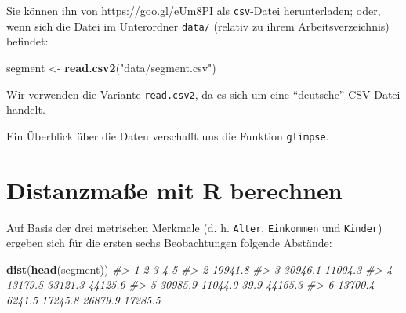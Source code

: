 \documentclass[12pt,ngerman,]{book}
\makeatletter
\newenvironment{Shaded}{\begin{snugshade}}{\end{snugshade}}
\newcommand{\KeywordTok}[1]{\textcolor[rgb]{0.13,0.29,0.53}{\textbf{{#1}}}}
\newcommand{\StringTok}[1]{\textcolor[rgb]{0.31,0.60,0.02}{{#1}}}
\newcommand{\CommentTok}[1]{\textcolor[rgb]{0.56,0.35,0.01}{\textit{{#1}}}}
\newcommand{\NormalTok}[1]{{#1}}
\newenvironment{kframe}{%
\medskip{}
\setlength{\fboxsep}{.8em}
 \def\at@end@of@kframe{}%
 \ifinner\ifhmode%
  \def\at@end@of@kframe{\end{minipage}}%
  \begin{minipage}{\columnwidth}%
 \fi\fi%
 \def\FrameCommand##1{\hskip\@totalleftmargin \hskip-\fboxsep
 \colorbox{shadecolor}{##1}\hskip-\fboxsep
     \hskip-\linewidth \hskip-\@totalleftmargin \hskip\columnwidth}%
 \MakeFramed {\advance\hsize-\width
   \@totalleftmargin\z@ \linewidth\hsize
   \@setminipage}}%
 {\par\unskip\endMakeFramed%
 \at@end@of@kframe}
\renewenvironment{Shaded}{\begin{kframe}}{\end{kframe}}
\makeatother
\begin{document}
Sie können ihn von \url{https://goo.gl/eUm8PI} als \texttt{csv}-Datei
herunterladen; oder, wenn sich die Datei im Unterordner \texttt{data/}
(relativ zu ihrem Arbeitsverzeichnis) befindet:

\begin{Shaded}
\begin{Highlighting}[]
\NormalTok{segment <-}\StringTok{ }\KeywordTok{read.csv2}\NormalTok{(}\StringTok{"data/segment.csv"}\NormalTok{)}
\end{Highlighting}
\end{Shaded}

Wir verwenden die Variante \texttt{read.csv2}, da es sich um eine
``deutsche'' CSV-Datei handelt.

Ein Überblick über die Daten verschafft uns die Funktion
\texttt{glimpse}.

\begin{Shaded}
\end{Shaded}

\section{Distanzmaße mit R berechnen}\label{distanzmae-mit-r-berechnen}

Auf Basis der drei metrischen Merkmale (d. h. \texttt{Alter},
\texttt{Einkommen} und \texttt{Kinder}) ergeben sich für die ersten
sechs Beobachtungen folgende Abstände:

\begin{Shaded}
\begin{Highlighting}[]
\KeywordTok{dist}\NormalTok{(}\KeywordTok{head}\NormalTok{(segment))}
\CommentTok{#>         1       2       3       4       5}
\CommentTok{#> 2 19941.8                                }
\CommentTok{#> 3 30946.1 11004.3                        }
\CommentTok{#> 4 13179.5 33121.3 44125.6                }
\CommentTok{#> 5 30985.9 11044.0    39.9 44165.3        }
\CommentTok{#> 6 13700.4  6241.5 17245.8 26879.9 17285.5}
\end{Highlighting}
\end{Shaded}
\end{document}
